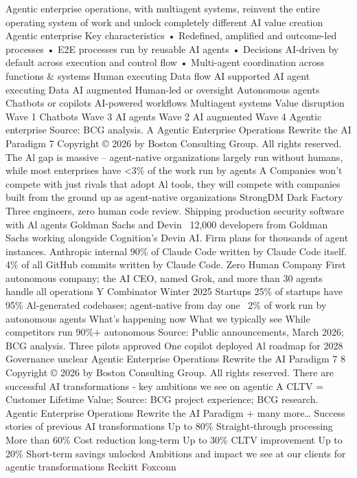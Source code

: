 Agentic enterprise operations, with multiagent systems, reinvent the entire
operating system of work and unlock completely different AI value creation
Agentic enterprise
Key characteristics
• Redefined, amplified and
outcome-led processes
• E2E processes run by reusable
AI agents
• Decisions AI-driven by default
across execution and control flow
• Multi-agent coordination
across functions \& systems
Human executing
Data flow
AI supported
AI agent executing
Data
AI augmented
Human-led or oversight
Autonomous agents
Chatbots or copilots
AI-powered workflows
Multiagent systems
Value disruption
Wave 1
Chatbots
Wave 3
AI agents
Wave 2
AI augmented
Wave 4
Agentic enterprise
Source: BCG analysis.
A
Agentic Enterprise Operations Rewrite the AI Paradigm
7
Copyright © 2026 by Boston Consulting Group. All rights reserved.
The Al gap is massive – agent-native organizations largely run without
humans, while most enterprises have <3\% of the work run by agents
A
Companies won’t compete with just rivals that adopt Al tools, they will compete with companies built from the ground up as agent-native organizations
StrongDM Dark Factory
Three engineers, zero human code review. Shipping production
security software with Al agents
Goldman Sachs and Devin
~12,000 developers from Goldman Sachs working alongside
Cognition's Devin AI. Firm plans for thousands of agent instances.
Anthropic internal
90\% of Claude Code written by Claude Code itself. 4\% of all GitHub
commits written by Claude Code.
Zero Human Company
First autonomous company; the AI CEO, named Grok, and more
than 30 agents handle all operations
Y Combinator Winter 2025 Startups
25\% of startups have 95\% Al-generated codebases; agent-native
from day one
~2\%
of work run by
autonomous
agents
What’s happening now
What we typically see
While competitors run 90\%+ autonomous
Source: Public announcements, March 2026; BCG analysis.
Three pilots
approved
One copilot
deployed
Al roadmap
for 2028
Governance
unclear
Agentic Enterprise Operations Rewrite the AI Paradigm
7
8
Copyright © 2026 by Boston Consulting Group. All rights reserved.
There are successful AI transformations - key ambitions we see on agentic
A
CLTV = Customer Lifetime Value; Source: BCG project experience; BCG research.
Agentic Enterprise Operations Rewrite the AI Paradigm
+ many more…
Success stories of
previous AI
transformations
Up to
80\%
Straight-through
processing
More than
60\%
Cost reduction
long-term
Up to
30\%
CLTV
improvement
Up to
20\%
Short-term savings
unlocked
Ambitions and impact we see at our clients for agentic transformations
Reckitt
Foxconn
